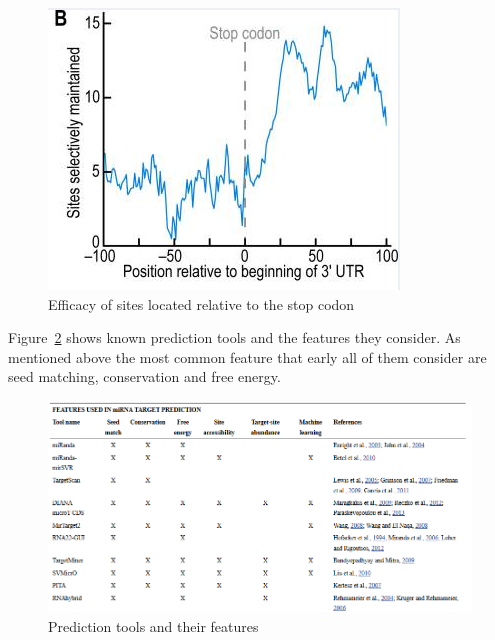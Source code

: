 \documentclass[12pt]{article}
\begin{document}
\begin{figure}
\centering
\includegraphics[scale=0.7]{results/site_stop.PNG} 
\caption{Efficacy of sites located relative to the stop codon}
\label{sitestop}
\end{figure}

   

Figure~\ref{fig:tools} shows known prediction tools and the features they consider. As mentioned above the most common feature that early all of them consider are seed matching, conservation and free energy. 


\begin{figure}
\centering
\includegraphics[scale=0.5]{results/tools.PNG}
\caption{Prediction tools and their features}
\label{fig:tools}
\end{figure}
\end{document}
